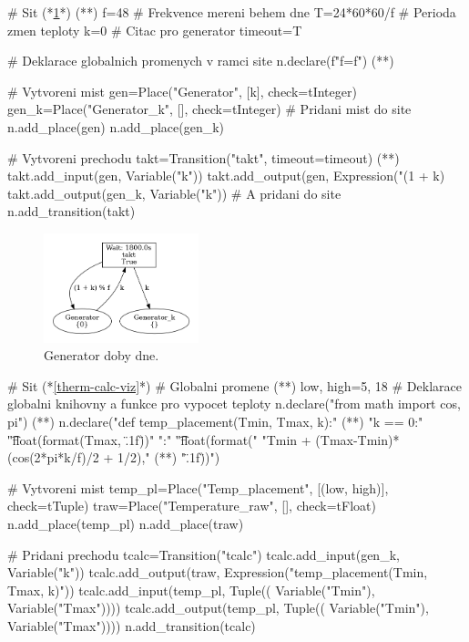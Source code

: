 \begin{python}
  # Sit (*\ref{therm-gen-viz}*) (*\label{code:gen-therm-draw}*)
  f=48 # Frekvence mereni behem dne
  T=24*60*60/f # Perioda zmen teploty
  k=0 # Citac pro generator
  timeout=T
  
  # Deklarace globalnich promenych v ramci site
  n.declare(f"f={f}") (*\label{code:snakes-glob-var}*)
  
  # Vytvoreni mist
  gen=Place("Generator", [k], check=tInteger)
  gen_k=Place("Generator_k", [], check=tInteger)
  # Pridani mist do site
  n.add_place(gen)
  n.add_place(gen_k)

  # Vytvoreni prechodu
  takt=Transition("takt", timeout=timeout) (*\label{code:timed-temp-example}*)
  takt.add_input(gen, Variable("k"))
  takt.add_output(gen, Expression("(1 + k) %
  takt.add_output(gen_k, Variable("k"))
  # A pridani do site
  n.add_transition(takt)
\end{python}

\begin{figure}[htb]
  \centering
  \includegraphics[width=0.4\textwidth]{obrazky-figures/therm-gen.png}
  \caption{Generator doby dne.}
  \label{therm-gen-viz}
\end{figure}

\begin{python}
  # Sit (*\ref{therm-calc-viz}*)
  # Globalni promene (*\label{code:therm-calc-draw}*)
  low, high=5, 18
  # Deklarace globalni knihovny a funkce pro vypocet teploty
  n.declare("from math import cos, pi") (*\label{code:decl-libs}*)
  n.declare("def temp_placement(Tmin, Tmax, k):" (*\label{code:decl-func}*)
  "\n\tif k == 0:"
  "\n\t\treturn float(format(Tmax, \".1f\"))"
  "\n\telse:"
  "\n\t\treturn float(format("
  "Tmin + (Tmax-Tmin)*(cos(2*pi*k/f)/2 + 1/2)," (*\label{code:lib-import-usage}*)
  "\".1f\"))")

  # Vytvoreni mist
  temp_pl=Place("Temp_placement", [(low, high)], check=tTuple)
  traw=Place("Temperature_raw", [], check=tFloat)
  n.add_place(temp_pl)
  n.add_place(traw)

  # Pridani prechodu
  tcalc=Transition("tcalc")
  tcalc.add_input(gen_k, Variable("k"))
  tcalc.add_output(traw, Expression("temp_placement(Tmin, Tmax, k)"))
  tcalc.add_input(temp_pl, Tuple((
    Variable("Tmin"), Variable("Tmax"))))
  tcalc.add_output(temp_pl, Tuple((
    Variable("Tmin"), Variable("Tmax"))))
  n.add_transition(tcalc)
\end{python}

